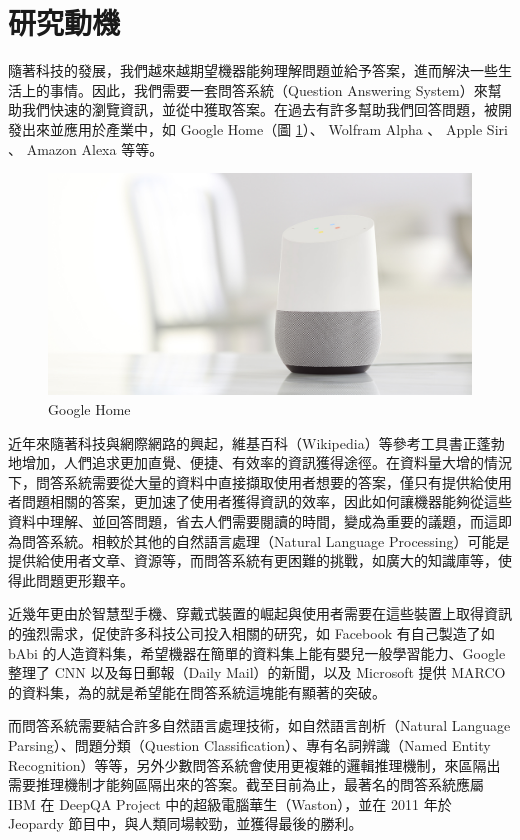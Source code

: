 \section{研究動機}
隨著科技的發展，我們越來越期望機器能夠理解問題並給予答案，進而解決一些生活上的事情。因此，我們需要一套問答系統（Question Answering System）來幫助我們快速的瀏覽資訊，並從中獲取答案。在過去有許多幫助我們回答問題，被開發出來並應用於產業中，如 Google Home（圖 \ref{fig:home_banner}）、 Wolfram Alpha 、 Apple Siri 、 Amazon Alexa 等等。

\begin{figure}
    \centering
    \includegraphics[scale=0.4]{images/home_banner.jpg}
    \caption{Google Home}\label{fig:home_banner}
\end{figure}

近年來隨著科技與網際網路的興起，維基百科（Wikipedia）等參考工具書正蓬勃地增加，人們追求更加直覺、便捷、有效率的資訊獲得途徑。在資料量大增的情況下，問答系統需要從大量的資料中直接擷取使用者想要的答案，僅只有提供給使用者問題相關的答案，更加速了使用者獲得資訊的效率，因此如何讓機器能夠從這些資料中理解、並回答問題，省去人們需要閱讀的時間，變成為重要的議題，而這即為問答系統。相較於其他的自然語言處理（Natural Language Processing）可能是提供給使用者文章、資源等，而問答系統有更困難的挑戰，如廣大的知識庫等，使得此問題更形艱辛。

近幾年更由於智慧型手機、穿戴式裝置的崛起與使用者需要在這些裝置上取得資訊的強烈需求，促使許多科技公司投入相關的研究，如 Facebook 有自己製造了如 bAbi 的人造資料集，希望機器在簡單的資料集上能有嬰兒一般學習能力、Google 整理了 CNN 以及每日郵報（Daily Mail）的新聞，以及 Microsoft 提供 MARCO 的資料集，為的就是希望能在問答系統這塊能有顯著的突破。

而問答系統需要結合許多自然語言處理技術，如自然語言剖析（Natural Language Parsing）、問題分類（Question Classification）、專有名詞辨識（Named Entity Recognition）等等，另外少數問答系統會使用更複雜的邏輯推理機制，來區隔出需要推理機制才能夠區隔出來的答案。截至目前為止，最著名的問答系統應屬 IBM 在 DeepQA Project 中的超級電腦華生（Waston），並在 2011 年於 Jeopardy 節目中，與人類同場較勁，並獲得最後的勝利。

